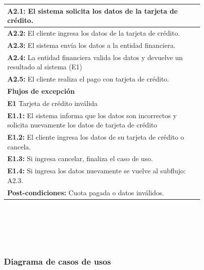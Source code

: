 \documentclass[12pt,a4paper,titlepage,oneside]{article}
\begin{document}
\begin{tabular}{| l | p{0.8\linewidth} |}
	\multicolumn{2}{|p{0.8\linewidth}|}{\textbf{A2.1:} El sistema solicita los datos de la tarjeta de crédito.} \\ \hline
	\multicolumn{2}{|p{0.8\linewidth}|}{\textbf{A2.2:} El cliente ingresa los datos de la tarjeta de crédito.} \\ \hline
	\multicolumn{2}{|p{0.8\linewidth}|}{\textbf{A2.3:} El sistema envía los datos a la entidad financiera.} \\ \hline
	\multicolumn{2}{|p{0.8\linewidth}|}{\textbf{A2.4:} La entidad financiera valida los datos y devuelve un resultado al sistema (E1)} \\ \hline
	\multicolumn{2}{|p{0.8\linewidth}|}{\textbf{A2.5:} El cliente realiza el pago con tarjeta de crédito.} \\ \hline
	\multicolumn{2}{|p{0.8\linewidth}|}{\textbf{Flujos de excepci\'on}} \\ \hline
	\multicolumn{2}{|p{0.8\linewidth}|}{\textbf{E1} Tarjeta de crédito inválida} \\ \hline
	\multicolumn{2}{|p{0.8\linewidth}|}{\textbf{E1.1:} El sistema informa que los datos son incorrectos y solicita nuevamente los datos de tarjeta de crédito} \\ \hline
	\multicolumn{2}{|p{0.8\linewidth}|}{\textbf{E1.2:} El cliente ingresa los datos de su tarjeta de crédito o cancela.} \\ \hline
	\multicolumn{2}{|p{0.8\linewidth}|}{\textbf{E1.3:} Si ingresa cancelar, finaliza el caso de uso.} \\ \hline
	\multicolumn{2}{|p{0.8\linewidth}|}{\textbf{E1.4:} Si ingresa los datos nuevamente se vuelve al subflujo: A2.3.} \\ \hline
	\multicolumn{2}{|p{0.8\linewidth}|}{\textbf{Post-condiciones:} Cuota pagada o datos inválidos.}\\ \hline
\end{tabular} \\\\
 \\\\


\subsubsection{Diagrama de casos de usos}
 
\end{document}
